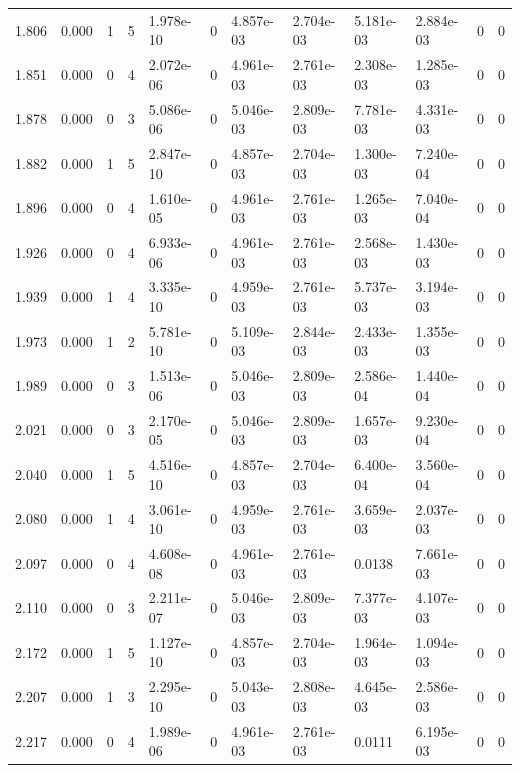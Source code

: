 \documentclass[preview]{standalone}
\begin{document}
{{{\begin{tabular}{L{1.2cm}C{1.2cm} C{0.3cm}C{0.5cm} C{1.4cm}C{1.4cm} C{1.4cm}C{1.4cm} C{1.6cm}C{1.6cm} C{1.6cm}C{1.6cm}}
  1.806  &  0.000  & 1     &  5 &  1.978e-10  & 0  &  4.857e-03&   2.704e-03& 5.181e-03 & 2.884e-03   &  0 & 0  \\ 
  1.851  &  0.000  & 0     &  4 &  2.072e-06  & 0  &  4.961e-03&   2.761e-03& 2.308e-03 & 1.285e-03   &  0 & 0  \\ 
  1.878  &  0.000  & 0     &  3 &  5.086e-06  & 0  &  5.046e-03&   2.809e-03& 7.781e-03 & 4.331e-03   &  0 & 0  \\ 
  1.882  &  0.000  & 1     &  5 &  2.847e-10  & 0  &  4.857e-03&   2.704e-03& 1.300e-03 & 7.240e-04   &  0 & 0  \\ 
  1.896  &  0.000  & 0     &  4 &  1.610e-05  & 0  &  4.961e-03&   2.761e-03& 1.265e-03 & 7.040e-04   &  0 & 0  \\ 
  1.926  &  0.000  & 0     &  4 &  6.933e-06  & 0  &  4.961e-03&   2.761e-03& 2.568e-03 & 1.430e-03   &  0 & 0  \\ 
  1.939  &  0.000  & 1     &  4 &  3.335e-10  & 0  &  4.959e-03&   2.761e-03& 5.737e-03 & 3.194e-03   &  0 & 0  \\ 
  1.973  &  0.000  & 1     &  2 &  5.781e-10  & 0  &  5.109e-03&   2.844e-03& 2.433e-03 & 1.355e-03   &  0 & 0  \\ 
  1.989  &  0.000  & 0     &  3 &  1.513e-06  & 0  &  5.046e-03&   2.809e-03& 2.586e-04 & 1.440e-04   &  0 & 0  \\ 
  2.021  &  0.000  & 0     &  3 &  2.170e-05  & 0  &  5.046e-03&   2.809e-03& 1.657e-03 & 9.230e-04   &  0 & 0  \\ 
  2.040  &  0.000  & 1     &  5 &  4.516e-10  & 0  &  4.857e-03&   2.704e-03& 6.400e-04 & 3.560e-04   &  0 & 0  \\ 
  2.080  &  0.000  & 1     &  4 &  3.061e-10  & 0  &  4.959e-03&   2.761e-03& 3.659e-03 & 2.037e-03   &  0 & 0  \\ 
  2.097  &  0.000  & 0     &  4 &  4.608e-08  & 0  &  4.961e-03&   2.761e-03& 0.0138 & 7.661e-03   &  0 & 0  \\ 
  2.110  &  0.000  & 0     &  3 &  2.211e-07  & 0  &  5.046e-03&   2.809e-03& 7.377e-03 & 4.107e-03   &  0 & 0  \\ 
  2.172  &  0.000  & 1     &  5 &  1.127e-10  & 0  &  4.857e-03&   2.704e-03& 1.964e-03 & 1.094e-03   &  0 & 0  \\ 
  2.207  &  0.000  & 1     &  3 &  2.295e-10  & 0  &  5.043e-03&   2.808e-03& 4.645e-03 & 2.586e-03   &  0 & 0  \\ 
  2.217  &  0.000  & 0     &  4 &  1.989e-06  & 0  &  4.961e-03&   2.761e-03& 0.0111 & 6.195e-03   &  0 & 0  \\ 

\end{tabular}}}}
\end{document}
